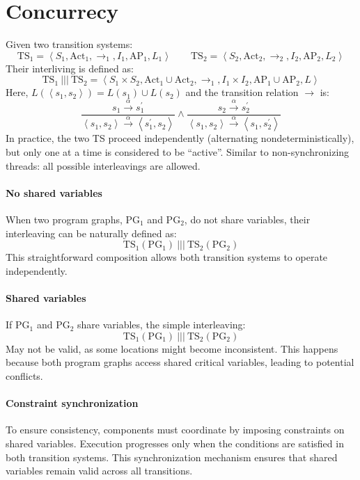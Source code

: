 \section{Concurrecy}

Given two transition systems: 
\[\text{TS}_1=\left\langle S_1, \text{Act}_1, \rightarrow_1, I_1,\text{AP}_1, L_1\right\rangle \qquad \text{TS}_2=\left\langle S_2, \text{Act}_2, \rightarrow_2, I_2,\text{AP}_2, L_2\right\rangle\]    
Their interliving is defined as: 
\[\text{TS}_1\:|||\:\text{TS}_2=\left\langle S_1\times S_2, \text{Act}_1 \cup \text{Act}_2, \rightarrow_1, I_1\times I_2,\text{AP}_1\cup \text{AP}_2, L\right\rangle\]
Here,  $L(\left\langle s_1,s_2\right\rangle )= L(s_1) \cup L(s_2)$ and the transition relation $\rightarrow$ is:
\[\dfrac{s_1\overset{\alpha}{\rightarrow}s_1^\prime}{\left\langle s_1,s_2\right\rangle \overset{\alpha}{\rightarrow}\left\langle s_1^\prime,s_2\right\rangle} \land \dfrac{s_2\overset{\alpha}{\rightarrow}s_2^\prime}{\left\langle s_1,s_2\right\rangle \overset{\alpha}{\rightarrow}\left\langle s_1,s_2^\prime\right\rangle}\]
In practice, the two TS proceed independently (alternating nondeterministically), but only one at a time is considered to be “active”. 
Similar to non-synchronizing threads: all possible interleavings are allowed.

\paragraph*{No shared variables}
When two program graphs, $\text{PG}_1$ and $\text{PG}_2$, do not share variables, their interleaving can be naturally defined as:
\[\text{TS}_1(\text{PG}_1)\:|||\: \text{TS}_2(\text{PG}_2)\] 
This straightforward composition allows both transition systems to operate independently.

\paragraph*{Shared variables} 
If $\text{PG}_1$ and $\text{PG}_2$ share variables, the simple interleaving:
\[\text{TS}_1(\text{PG}_1)\:|||\:\text{TS}_2(\text{PG}_2)\] 
May not be valid, as some locations might become inconsistent. 
This happens because both program graphs access shared critical variables, leading to potential conflicts.

\paragraph*{Constraint synchronization}
To ensure consistency, components must coordinate by imposing constraints on shared variables.
Execution progresses only when the conditions are satisfied in both transition systems. 
This synchronization mechanism ensures that shared variables remain valid across all transitions.

